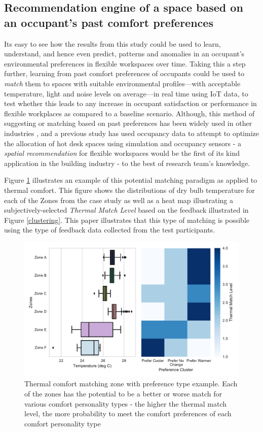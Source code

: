 \documentclass[]{interact}
\theoremstyle{plain}%
\theoremstyle{definition}
\theoremstyle{remark}
\begin{document}
\subsection{Recommendation engine of a space based on an occupant's past comfort preferences}

Its easy to see how the results from this study could be used to learn, understand, and hence even predict, patterns and anomalies in an occupant's environmental preferences in flexible workspaces over time. Taking this a step further, learning from past comfort preferences of occupants could be used to \emph{match} them to spaces with suitable environmental profiles---with acceptable temperature, light and noise levels on average---in real time using IoT data, to test whether this leads to any increase in occupant satisfaction or performance in flexible workplaces as compared to a baseline scenario. Although, this method of suggesting or matching based on past preferences has been widely used in other industries \citep{Recommender, Resnick}, and a previous study has used occupancy data to attempt to optimize the allocation of hot desk spaces using simulation and occupancy sensors \citep{Cooper2017AnData} - a \emph{spatial recommendation} for flexible workspaces would be the first of its kind application in the building industry - to the best of research team's knowledge. 

Figure \ref{matching} illustrates an example of this potential matching paradigm as applied to thermal comfort. This figure shows the distributions of dry bulb temperature for each of the Zones from the case study as well as a heat map illustrating a subjectively-selected \emph{Thermal Match Level} based on the feedback illustrated in Figure \ref{clustering}. This paper illustrates that this type of matching is possible using the type of feedback data collected from the test participants.


\begin{figure}[ht!]
\centering
\includegraphics[scale=0.6]{figures/thermal_preference_matching.pdf}
\caption{Thermal comfort matching zone with preference type example. Each of the zones has the potential to be a better or worse match for various comfort personality types - the higher the thermal match level, the more probability to meet the comfort preferences of each comfort personality type} 
\label{matching}
\end{figure}
\end{document}

